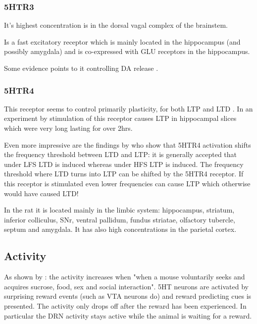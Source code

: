 \documentclass[12pt,a4paper]{article}
\begin{document}
\subsubsection{5HTR3}

It's highest concentration is in the dorsal vagal complex of the brainstem. 

Is a fast excitatory receptor which is mainly located in the hippocampus (and possibly amygdala) \citep{Palacios1990} and is co-expressed with GLU receptors in the hippocampus.

Some evidence points to it controlling DA release \citep{Mengod2010}.

\subsubsection{5HTR4}

This receptor seems to control primarily plasticity, for both LTP and LTD \citep{Penas-Cazorla2015}. In an experiment by \citep{Mlinar2006} stimulation of this receptor causes LTP in hippocampal slices which were very long lasting for over 2hrs.

Even more impressive are the findings by \citep{Hagena2017} who show that 5HTR4 activation shifts the frequency threshold between LTD and LTP: it is generally accepted that under LFS LTD is induced whereas under HFS LTP is induced. The frequency threshold where LTD turns into LTP can be shifted by the 5HTR4 receptor. If this receptor is stimulated even lower frequencies can cause LTP which otherwise would have caused LTD!

In the rat it is located mainly in the limbic system: hippocampus, striatum, inferior colliculus, SNr, ventral pallidum, fundus striatae, olfactory tubercle, septum and amygdala. It has also high concentrations in the parietal cortex.




\subsection{Activity}

As shown by \citep{Li2016}: the activity increases when "when a mouse voluntarily seeks and acquires sucrose, food, sex and social interaction". 5HT neurons are activated by surprising reward events (such as VTA neurons do) and reward predicting cues is presented. The activity only drops off after the reward has been experienced. In particular the DRN activity stays active while the animal is waiting for a reward.
\end{document}
